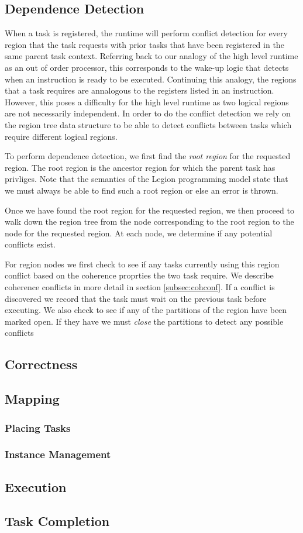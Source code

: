 \subsection{Dependence Detection}
\label{subsec:depdetect}
When a task is registered, the runtime
will perform conflict detection for every region that the task requests with
prior tasks that have been registered in the same parent task context.  Referring
back to our analogy of the high level runtime as an out of order processor, this
corresponds to the wake-up logic that detects when an instruction is ready to be
executed.  Continuing this analogy, the regions that a task requires are annalogous
to the registers listed in an instruction.  However, this poses a difficulty for the
high level runtime as two logical regions are not necessarily independent.  In
order to do the conflict detection we rely on the region tree data structure to be
able to detect conflicts between tasks which require different logical regions.

To perform dependence detection, we first find the {\em root region} for the 
requested region.  The root region is the ancestor region for which the parent task
has privliges.  Note that the semantics of the Legion programming model state that
we must always be able to find such a root region or else an error is thrown.  

Once we have found the root region for the requested region, we then proceed to walk
down the region tree from the node corresponding to the root region to the node
for the requested region.  At each node, we determine if any potential conflicts exist.

For region nodes we first check to see if any tasks currently using this region
conflict based on the coherence proprties the two task require.  We describe coherence
conflicts in more detail in section \ref{subsec:cohconf}.  If a conflict is discovered
we record that the task must wait on the previous task before executing.  We also check
to see if any of the partitions of the region have been marked open.  If they have
we must {\em close} the partitions to detect any possible conflicts

\subsection{Correctness}

\subsection{Mapping}

\subsubsection{Placing Tasks}

\subsubsection{Instance Management}
\label{subsec:instmang}

\subsection{Execution}

\subsection{Task Completion}
